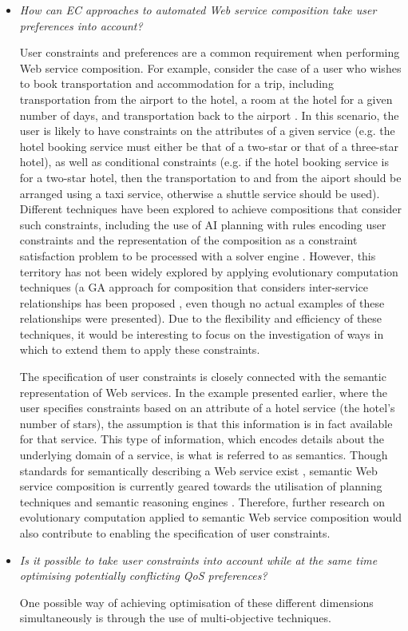 \begin{itemize}
 \item \textit{How can EC approaches to automated Web service composition take user preferences into account?}
 
 User constraints and preferences are a common requirement when performing Web service composition. For example,
 consider the case of a user who wishes to book transportation and accommodation for a trip, including transportation
 from the airport to the hotel, a room at the hotel for a given number of days, and transportation back
 to the airport \cite{boustil2010web}. In this scenario, the user is likely to have constraints on the attributes
 of a given service (e.g. the hotel booking service must either be that of a two-star or that of a three-star hotel),
 as well as conditional constraints (e.g. if the hotel booking service is for a two-star hotel, then the transportation
 to and from the aiport should be arranged using a taxi service, otherwise a shuttle service should be used). Different
 techniques have been explored to achieve compositions that consider such constraints, including the use of AI planning
 with rules encoding user constraints \cite{DBLP:journals/soca/BoustilMS14} and the representation of the composition
 as a constraint satisfaction problem to be processed with a solver engine \cite{karakoc2009composing}. However, this
 territory has not been widely explored by applying evolutionary computation techniques (a GA approach for composition
 that considers inter-service relationships has been proposed \cite{zhang2013genetic}, even though no actual examples
 of these relationships were presented). Due to the flexibility and efficiency of these techniques, it would be
 interesting to focus on the investigation of ways in which to extend them to apply these constraints.
 
 The specification of user constraints is closely connected with the semantic representation of Web services. In the
 example presented earlier, where the user specifies constraints based on an attribute of a hotel service (the hotel's
 number of stars), the assumption is that this information is in fact available for that service. This type of information,
 which encodes details about the underlying domain of a service, is what is referred to as semantics. Though standards
 for semantically describing a Web service exist \cite{martin2007bringing}, semantic Web service composition is currently
 geared towards the utilisation of planning techniques and semantic reasoning engines \cite{saboohi2011world}. Therefore,
 further research on evolutionary computation applied to semantic Web service composition would also contribute to enabling
 the specification of user constraints.
 
 \item \textit{Is it possible to take user constraints into account while at the same time optimising potentially conflicting
 QoS preferences?}
 
 One possible way of achieving optimisation of these different dimensions simultaneously is through the use of multi-objective
 techniques.
 
\end{itemize}

